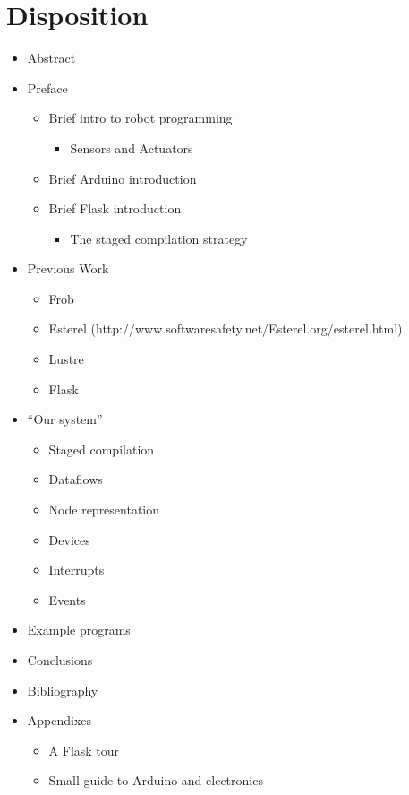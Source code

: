 \documentclass[a4paper,oneside, draft]{memoir}
\begin{document}
\section{Disposition}
\begin{itemize}
\item Abstract

\item Preface
  \begin{itemize}
  \item Brief intro to robot programming
    \begin{itemize}
     \item Sensors and Actuators
    \end{itemize}
  \item Brief Arduino introduction
  \item Brief Flask introduction
    \begin{itemize}
     \item The staged compilation strategy
    \end{itemize}
  \end{itemize}

\item Previous Work
  \begin{itemize}
  \item Frob
  \item Esterel
    (http://www.softwaresafety.net/Esterel.org/esterel.html)
  \item Lustre \cite{lustre91}
  \item Flask
  \end{itemize}

\item "`Our system"'
  \begin{itemize}
  \item Staged compilation
  \item Dataflows
  \item Node representation
  \item Devices
  \item Interrupts
  \item Events
  \end{itemize}

\item Example programs

\item Conclusions

\item Bibliography

\item Appendixes
  \begin{itemize}
  \item A Flask tour
  \item Small guide to Arduino and electronics
  \end{itemize}
\end{itemize}  
\end{document}

